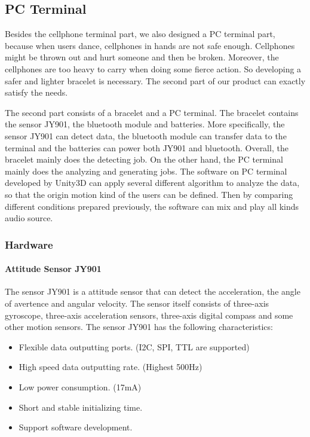 \subsection{PC Terminal}

Besides the cellphone terminal part, we also designed a PC terminal part,
because when users dance, cellphones in hands are not safe enough. Cellphones
might be thrown out and hurt someone and then be broken. Moreover, the
cellphones are too heavy to carry when doing some fierce action. So developing a
safer and lighter bracelet is necessary. The second part of our product can
exactly satisfy the needs.  

The second part consists of a bracelet and a PC terminal. The bracelet contains
the sensor JY901, the bluetooth module and batteries. More specifically, the
sensor JY901 can detect data, the bluetooth module can transfer data to the
terminal and the batteries can power both JY901 and bluetooth. Overall, the
bracelet mainly does the detecting job. On the other hand, the PC terminal
mainly does the analyzing and generating jobs. The software on PC terminal
developed by Unity3D can apply several different algorithm to analyze the data,
so that the origin motion kind of the users can be defined. Then by comparing
different conditions prepared previously, the software can mix and play all
kinds audio source.   


\subsubsection{Hardware}
\paragraph{Attitude Sensor JY901}

The sensor JY901 is a attitude sensor that can detect the
acceleration, the angle of avertence and angular velocity. The sensor itself
consists of three-axis gyroscope, three-axis acceleration sensors, three-axis
digital compass and some other motion sensors. The sensor JY901 has the
following characteristics: 

\begin{itemize}
\item Flexible data outputting ports. (I2C, SPI, TTL are supported)
\item High speed data outputting rate. (Highest 500Hz)
\item Low power consumption. (17mA)
\item Short and stable initializing time. 
\item Support software development. 
\end{itemize}
